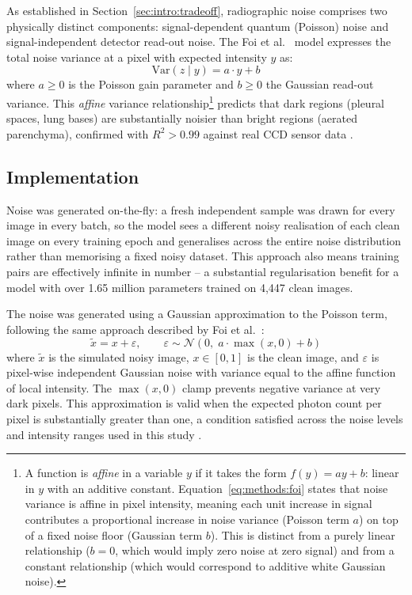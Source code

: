 \documentclass[12pt, a4paper, twoside, openright]{book}
\begin{document}
As established in Section~\ref{sec:intro:tradeoff}, radiographic noise comprises two physically distinct components: signal-dependent quantum (Poisson) noise and signal-independent detector read-out noise. The Foi et al.\ \cite{foi_practical_2008} model expresses the total noise variance at a pixel with expected intensity $y$ as:
\begin{equation}
\label{eq:methods:foi}
\mathrm{Var}(z \mid y) = a \cdot y + b
\end{equation}
where $a \geq 0$ is the Poisson gain parameter and $b \geq 0$ the Gaussian read-out variance. This \emph{affine} variance relationship\footnote{A function is \emph{affine} in a variable $y$ if it takes the form $f(y) = ay + b$: linear in $y$ with an additive constant. Equation~\ref{eq:methods:foi} states that noise variance is affine in pixel intensity, meaning each unit increase in signal contributes a proportional increase in noise variance (Poisson term $a$) on top of a fixed noise floor (Gaussian term $b$). This is distinct from a purely linear relationship ($b=0$, which would imply zero noise at zero signal) and from a constant relationship (which would correspond to additive white Gaussian noise).} predicts that dark regions (pleural spaces, lung bases) are substantially noisier than bright regions (aerated parenchyma), confirmed with $R^2 > 0.99$ against real CCD sensor data \cite{foi_practical_2008}.

\subsection{Implementation}
\label{sec:methods:noise:implementation}

Noise was generated on-the-fly: a fresh independent sample was drawn for every image in every batch, so the model sees a different noisy realisation of each clean image on every training epoch and generalises across the entire noise distribution rather than memorising a fixed noisy dataset. This approach also means training pairs are effectively infinite in number -- a substantial regularisation benefit for a model with over 1.65 million parameters trained on 4,447 clean images.

The noise was generated using a Gaussian approximation to the Poisson term, following
the same approach described by Foi et al.\ \cite{foi_practical_2008}:
\begin{equation}
\label{eq:methods:noise_impl}
\tilde{x} = x + \varepsilon, \qquad
\varepsilon \sim \mathcal{N}\!\left(0,\; a \cdot \max(x, 0) + b\right)
\end{equation}
where $\tilde{x}$ is the simulated noisy image, $x \in [0,1]$ is the clean image, and
$\varepsilon$ is pixel-wise independent Gaussian noise with variance equal to the affine
function of local intensity. The $\max(x, 0)$ clamp prevents negative variance at very dark
pixels. This approximation is valid when the expected photon count per pixel is substantially
greater than one, a condition satisfied across the noise levels and intensity ranges used in
this study \cite{foi_practical_2008}.
\end{document}
